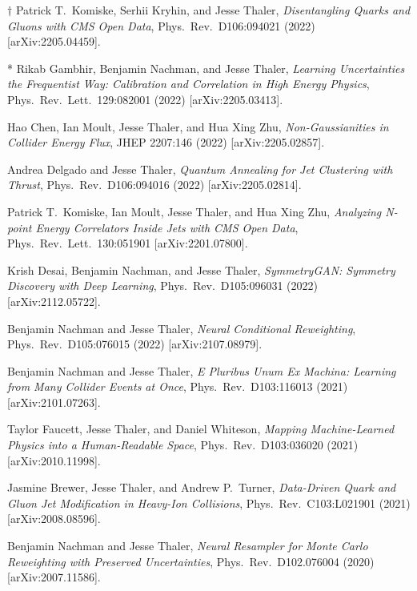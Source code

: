 \begin{list}{[]\addtocounter{jessecount}{-1}}{\leftmargin=3em \itemsep=4pt}
\item
$\dagger$ Patrick T.\ Komiske, Serhii Kryhin, and Jesse Thaler,
\emph{Disentangling Quarks and Gluons with CMS Open Data},
Phys.\ Rev.\ D106:094021 (2022)
[arXiv:2205.04459].

\item
* Rikab Gambhir, Benjamin Nachman, and Jesse Thaler,
\emph{Learning Uncertainties the Frequentist Way: Calibration and Correlation in High Energy Physics},
Phys.\ Rev.\ Lett.\ 129:082001 (2022)
[arXiv:2205.03413].

\item
 Hao Chen, Ian Moult, Jesse Thaler, and Hua Xing Zhu,
\emph{Non-Gaussianities in Collider Energy Flux},
JHEP 2207:146 (2022)
[arXiv:2205.02857].

\item
 Andrea Delgado and Jesse Thaler,
\emph{Quantum Annealing for Jet Clustering with Thrust},
Phys.\ Rev.\ D106:094016 (2022)
[arXiv:2205.02814].

\item
 Patrick T.\ Komiske, Ian Moult, Jesse Thaler, and Hua Xing Zhu,
\emph{Analyzing N-point Energy Correlators Inside Jets with CMS Open Data},
Phys.\ Rev.\ Lett.\ 130:051901
[arXiv:2201.07800].

\item
 Krish Desai, Benjamin Nachman, and Jesse Thaler,
\emph{SymmetryGAN: Symmetry Discovery with Deep Learning},
Phys.\ Rev.\ D105:096031 (2022)
[arXiv:2112.05722].

\item
 Benjamin Nachman and Jesse Thaler,
\emph{Neural Conditional Reweighting},
Phys.\ Rev.\ D105:076015 (2022)
[arXiv:2107.08979].

\item
 Benjamin Nachman and Jesse Thaler,
\emph{E Pluribus Unum Ex Machina: Learning from Many Collider Events at Once},
Phys.\ Rev.\ D103:116013 (2021)
[arXiv:2101.07263].

\item
 Taylor Faucett, Jesse Thaler, and Daniel Whiteson,
\emph{Mapping Machine-Learned Physics into a Human-Readable Space},
Phys.\ Rev.\ D103:036020 (2021)
[arXiv:2010.11998].

\item
 Jasmine Brewer, Jesse Thaler, and Andrew P.\ Turner,
\emph{Data-Driven Quark and Gluon Jet Modification in Heavy-Ion Collisions},
Phys.\ Rev.\ C103:L021901 (2021)
[arXiv:2008.08596].

\item
 Benjamin Nachman and Jesse Thaler,
\emph{Neural Resampler for Monte Carlo Reweighting with Preserved Uncertainties},
Phys.\ Rev.\ D102.076004 (2020)
[arXiv:2007.11586].


\end{list}
